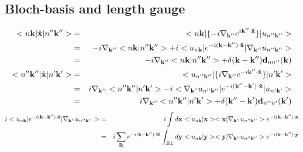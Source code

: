 \documentclass[aps,prb,preprint]{revtex4-1}
\begin{document}
\begin{appendix}
\section{Bloch-basis and length gauge}
%
\begin{eqnarray}
<n{\bf k}|\hat{\bf x}|n''{\bf k''}>&=& <n{\bf k}| \{ -i \nabla_{\bf k''} e^{i{\bf k'' \cdot \hat{x} }} \} |u_{n''{\bf k''}}>\nonumber \\
&=&  -i \nabla_{\bf k''} <n{\bf k}|n''{\bf k''}> + i <u_{n{\bf k}}| e^{-i{\bf (k-k'') \cdot \hat{x} }} |\nabla_{\bf k''} u_{n''{\bf k''}}>\nonumber \\
&=&  -i \nabla_{\bf k''} <n{\bf k}|n''{\bf k''}> + \delta({\bf k-k''}) {\bf d}_{nn''}({\bf k}) \\
<n''{\bf k''}|\hat{\bf x}|n'{\bf k'}>&=& <u_{n''{\bf k''}}| \{ i \nabla_{\bf k''} e^{-i{\bf k'' \cdot \hat{x} }} \} |n'{\bf k'}>\nonumber \\
&=&  i \nabla_{\bf k''} <n''{\bf k''}|n'{\bf k'}> - i <\nabla_{\bf k"} u_{n''{\bf k''}}| e^{-i{\bf (k''-k') \cdot \hat{x} }} |u_{n'{\bf k'}}>\nonumber \\
&=&  i \nabla_{\bf k''} <n''{\bf k''}|n'{\bf k'}> + \delta({\bf k''-k'}) {\bf d}_{n''n'}({\bf k'})
\end{eqnarray} 
%
\begin{eqnarray}
i <u_{n{\bf k}}| e^{-i{\bf (k-k'' )\cdot \hat{x}} }|\nabla_{\bf k''} u_{n''{\bf k''}}> &=& i \int d{\bf x} <u_{n{\bf k}}|{\bf x}> <{\bf x}|\nabla_{\bf k''} u_{n''{\bf k''}}> e^{-i{\bf (k-k'' )\cdot {x}} }\nonumber \\
&=& i \sum_{\bf R} e^{-i{\bf (k-k'' )\cdot {\bf R}} } \int_{BL} d{\bf y} <u_{n{\bf k}}|{\bf y}> <{\bf y}|\nabla_{\bf k''} u_{n''{\bf k''}}> e^{-i{\bf (k-k'' )\cdot {y}} } \nonumber \\

\end{eqnarray}
\end{appendix}
\end{document}
